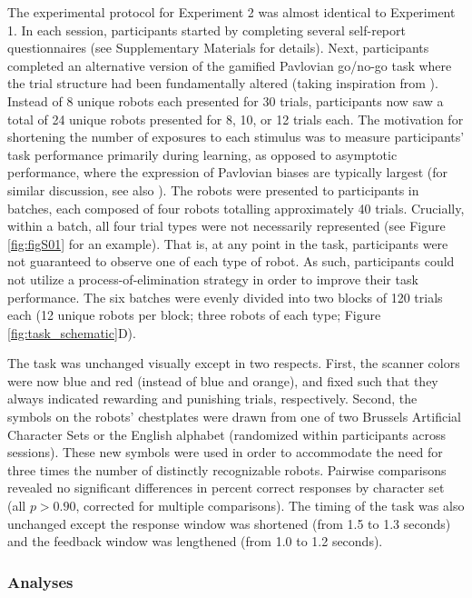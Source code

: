 \documentclass[a4paper,12pt]{article}
\begin{document}
\begin{refsection}[main]
The experimental protocol for Experiment 2 was almost identical to Experiment 1. In each session, participants started by completing several self-report questionnaires (see Supplementary Materials for details). Next, participants completed an alternative version of the gamified Pavlovian go/no-go task where the trial structure had been fundamentally altered (taking inspiration from \cite{wittmann2008striatal}). Instead of 8 unique robots each presented for 30 trials, participants now saw a total of 24 unique robots presented for 8, 10, or 12 trials each. The motivation for shortening the number of exposures to each stimulus was to measure participants' task performance primarily during learning, as opposed to asymptotic performance, where the expression of Pavlovian biases are typically largest (for similar discussion, see also \cite{zorowitzPLACEHOLDER}). The robots were presented to participants in batches, each composed of four robots totalling approximately 40 trials. Crucially, within a batch, all four trial types were not necessarily represented (see Figure \ref{fig:figS01} for an example). That is, at any point in the task, participants were not guaranteed to observe one of each type of robot. As such, participants could not utilize a process-of-elimination strategy in order to improve their task performance. The six batches were evenly divided into two blocks of 120 trials each (12 unique robots per block; three robots of each type; Figure \ref{fig:task_schematic}D).

The task was unchanged visually except in two respects. First, the scanner colors were now blue and red (instead of blue and orange), and fixed such that they always indicated rewarding and punishing trials, respectively. Second, the symbols on the robots' chestplates were drawn from one of two Brussels Artificial Character Sets \cite{vidal2017bacs} or the English alphabet (randomized within participants across sessions). These new symbols were used in order to accommodate the need for three times the number of distinctly recognizable robots. Pairwise comparisons revealed no significant differences in percent correct responses by character set (all $p > 0.90$, corrected for multiple comparisons). The timing of the task was also unchanged except the response window was shortened (from 1.5 to 1.3 seconds) and the feedback window was lengthened (from 1.0 to 1.2 seconds). 

\subsubsection*{Analyses}


\end{refsection}
\end{document}
